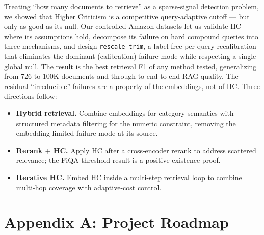 \documentclass[letterpaper]{article}
\begin{document}
Treating ``how many documents to retrieve'' as a sparse-signal
detection problem, we showed that Higher Criticism is a competitive
query-adaptive cutoff --- but only as good as its null. Our
controlled Amazon datasets let us validate HC where its assumptions
hold, decompose its failure on hard compound queries into three
mechanisms, and design \texttt{rescale\_trim}, a label-free per-query
recalibration that eliminates the dominant (calibration) failure mode
while respecting a single global null. The result is the best
retrieval F1 of any method tested, generalizing from 726 to 100K
documents and through to end-to-end RAG quality. The residual
``irreducible'' failures are a property of the embeddings, not of HC.
Three directions follow:
\begin{itemize}
\item \textbf{Hybrid retrieval.} Combine embeddings for category
semantics with structured metadata filtering for the numeric
constraint, removing the embedding-limited failure mode at its source.
\item \textbf{Rerank $+$ HC.} Apply HC after a cross-encoder rerank to
address scattered relevance; the FiQA threshold result is a positive
existence proof.
\item \textbf{Iterative HC.} Embed HC inside a multi-step retrieval
loop to combine multi-hop coverage with adaptive-cost control.
\end{itemize}




\clearpage
\onecolumn
\section*{Appendix A: Project Roadmap}
\end{document}
